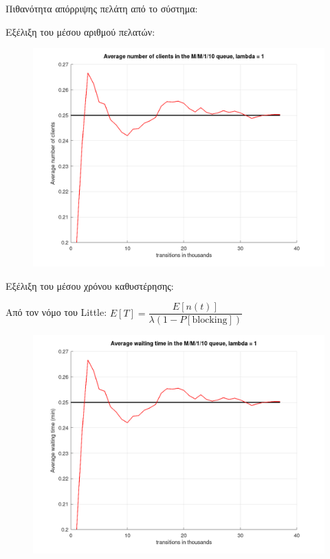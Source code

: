 \documentclass[a4paper]{article}
\begin{document}
\begin{minipage}{\textwidth}
Πιθανότητα απόρριψης πελάτη από το σύστημα:



Εξέλιξη του μέσου αριθμού πελατών:

\begin{figure}[H]
	\includegraphics[width=\textwidth]{images/clients1.png}
\end{figure}
\end{minipage}

\begin{minipage}{\textwidth}
Εξέλιξη του μέσου χρόνου καθυστέρησης:

Από τον νόμο του Little: $ E[T] = \dfrac{E[n(t)]}{λ(1-P[\text{blocking}])} $

\begin{figure}[H]
	\includegraphics[width=\textwidth]{images/time1.png}
\end{figure}

\end{minipage}
\end{document}
